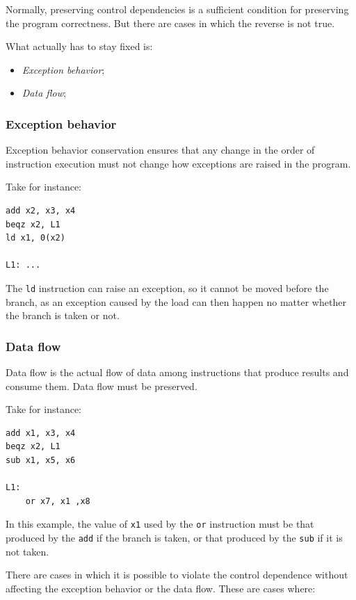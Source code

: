 \documentclass[a4paper,11pt]{article}
\begin{document}
Normally, preserving control dependencies is a sufficient
condition for preserving the program correctness.
But there are cases in which the reverse is not true.

What actually has to stay fixed is:
\begin{itemize}
	\item \textit{Exception behavior};
	\item \textit{Data flow};
\end{itemize}

\subsubsection{Exception behavior}

Exception behavior conservation ensures that any change in the order of instruction execution must not
change how exceptions are raised in the program.

Take for instance:
\begin{lstlisting}[language=riscv, style=codestyle]	
add x2, x3, x4
beqz x2, L1
ld x1, 0(x2)

L1: ...
\end{lstlisting}

The \texttt{ld} instruction can raise an exception, so it cannot be moved before the branch, as an exception caused by the load can then
happen no matter whether the branch is taken or not.

\subsubsection{Data flow}

Data flow is the actual flow of data among instructions that
produce results and consume them. Data flow must be
preserved.

Take for instance:
\begin{lstlisting}[language=riscv, style=codestyle]	
add x1, x3, x4
beqz x2, L1
sub x1, x5, x6

L1:
	or x7, x1 ,x8
\end{lstlisting}

In this example, the value of \texttt{x1} used by the \texttt{or} instruction must be that
produced by the \texttt{add} if the branch is taken, or that produced
by the \texttt{sub} if it is not taken.

\par\smallskip

There are cases in which it is possible to violate the
control dependence without affecting the exception
behavior or the data flow.
These are cases where:
\end{document}
